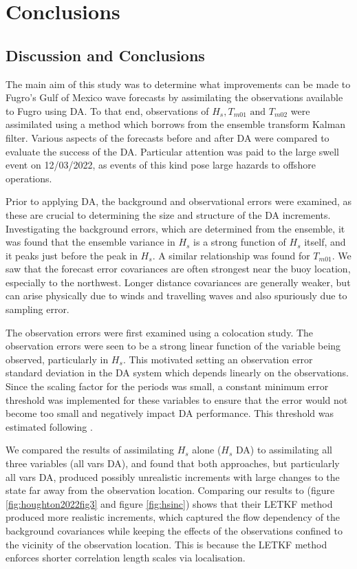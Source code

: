 
\chapter{Conclusions} %
\label{chap:conclusions} %

\section{Discussion and Conclusions}

The main aim of this study was to determine what improvements can be made to Fugro's Gulf of Mexico wave forecasts by assimilating the observations available to Fugro using DA. To that end, observations of $H_s, T_{m01} \text{ and } T_{m02}$ were assimilated using a method which borrows from the ensemble transform Kalman filter. Various aspects of the forecasts before and after DA were compared to evaluate the success of the DA. Particular attention was paid to the large swell event on 12/03/2022, as events of this kind pose large hazards to offshore operations.

Prior to applying DA, the background and observational errors were examined, as these are crucial to determining the size and structure of the DA increments. Investigating the background errors, which are determined from the ensemble, it was found that the ensemble variance in $H_s$ is a strong function of $H_s$ itself, and it peaks just before the peak in $H_s$. A similar relationship was found for $T_{m01}$. We saw that the forecast error covariances are often strongest near the buoy location, especially to the northwest. Longer distance covariances are generally weaker, but can arise physically due to winds and travelling waves and also spuriously due to sampling error.

The observation errors were first examined using a colocation study. The observation errors were seen to be a strong linear function of the variable being observed, particularly in $H_s$. This motivated setting an observation error standard deviation in the DA system which depends linearly on the observations. Since the scaling factor for the periods was small, a constant minimum error threshold was implemented for these variables to ensure that the error would not become too small and negatively impact DA performance. This threshold was estimated following \citet{Desroziers2005}.

We compared the results of assimilating $H_s$ alone ($H_s$ DA) to assimilating all three variables (all vars DA), and found that both approaches, but particularly all vars DA, produced possibly unrealistic increments with large changes to the state far away from the observation location. Comparing our results to \citet{Houghton2023} (figure \ref{fig:houghton2022fig3} and figure \ref{fig:hsinc}) shows that their LETKF method produced more realistic increments, which captured the flow dependency of the background covariances while keeping the effects of the observations confined to the vicinity of the observation location. This is because the LETKF method enforces shorter correlation length scales via localisation.

